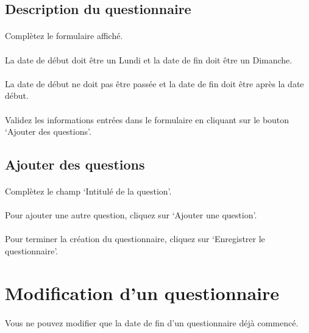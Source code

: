 \documentclass[french,12pt,a4paper,openany]{book}
\begin{document}
			\subsection{Description du questionnaire}
				\paragraph{}{Complètez le formulaire affiché.}
				\paragraph{}{La date de début doit être un Lundi et la date de fin doit être un Dimanche.}
				\paragraph{}{La date de début ne doit pas être passée et la date de fin doit être après la date début.}
				\paragraph{}{Validez les informations entrées dans le formulaire en cliquant sur le bouton `Ajouter des questions'.}
			\subsection{Ajouter des questions}
				\paragraph{}{Complètez le champ `Intitulé de la question'.}
				\paragraph{}{Pour ajouter une autre question, cliquez sur `Ajouter une question'.}
				\paragraph{}{Pour terminer la création du questionnaire, cliquez sur `Enregistrer le questionnaire'.}
		\section{Modification d'un questionnaire}
			\paragraph{}{Vous ne pouvez modifier que la date de fin d'un questionnaire déjà commencé.}
\end{document}
